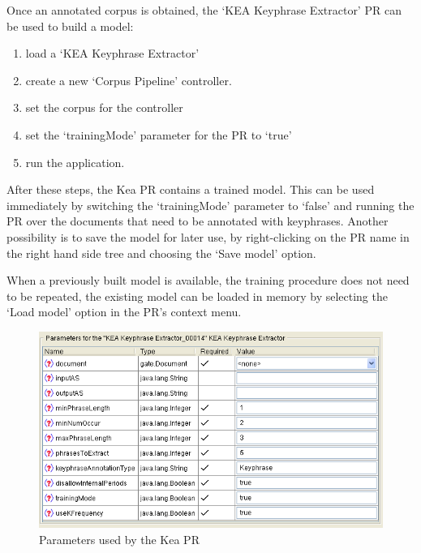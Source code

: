 Once an annotated corpus is obtained, the `KEA Keyphrase Extractor' PR can be
used to build a model:
\begin{enumerate}
\item load a `KEA Keyphrase Extractor'
\item create a new `Corpus Pipeline' controller.
\item set the corpus for the controller
\item set the `trainingMode' parameter for the PR to `true'
\item run the application.
\end{enumerate}

After these steps, the Kea PR contains a trained model. This can be used
immediately by switching the `trainingMode' parameter to `false' and running the
PR over the documents that need to be annotated with keyphrases. Another
possibility is to save the model for later use, by right-clicking on the PR name
in the right hand side tree and choosing the `Save model' option.

When a previously built model is available, the training procedure does not
need to be repeated, the existing model can be loaded in memory by selecting
the `Load model' option in the PR's context menu.
\begin{figure}
\includegraphics[scale=0.75]{keaParams.png}
\caption{Parameters used by the Kea PR}
\label{fig:keaParams}
\end{figure}

